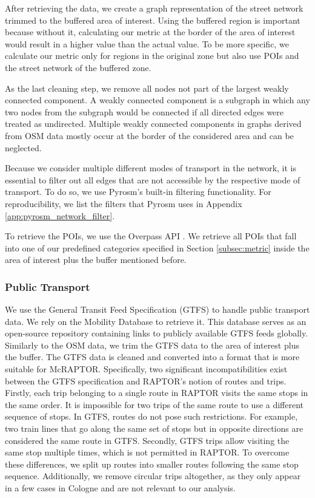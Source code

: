 After retrieving the data, we create a graph representation of the street network trimmed to the buffered area of interest.
Using the buffered region is important because without it, calculating our metric at the border of the area of interest would result in a higher value than the actual value.
To be more specific, we calculate our metric only for regions in the original zone but also use POIs and the street network of the buffered zone.

As the last cleaning step, we remove all nodes not part of the largest weakly connected component.
A weakly connected component is a subgraph in which any two nodes from the subgraph would be connected if all directed edges were treated as undirected.
Multiple weakly connected components in graphs derived from OSM data mostly occur at the border of the considered area and can be neglected.

Because we consider multiple different modes of transport in the network, it is essential to filter out all edges that are not accessible by the respective mode of transport.
To do so, we use Pyrosm's built-in filtering functionality.
For reproducibility, we list the filters that Pyrosm uses in Appendix \ref{app:pyrosm_network_filter}.

To retrieve the POIs, we use the Overpass API .
We retrieve all POIs that fall into one of our predefined categories specified in Section \ref{subsec:metric} inside the area of interest plus the buffer mentioned before.

\subsubsection{Public Transport}
\label{subs:public_transport}

We use the General Transit Feed Specification (GTFS)  to handle public transport data.
We rely on the Mobility Database  to retrieve it.
This database serves as an open-source repository containing links to publicly available GTFS feeds globally.
Similarly to the OSM data, we trim the GTFS data to the area of interest plus the buffer.
The GTFS data is cleaned and converted into a format that is more suitable for McRAPTOR.
Specifically, two significant incompatibilities exist between the GTFS specification and RAPTOR's notion of routes and trips.
Firstly, each trip belonging to a single route in RAPTOR visits the same stops in the same order.
It is impossible for two trips of the same route to use a different sequence of stops.
In GTFS, routes do not pose such restrictions.
For example, two train lines that go along the same set of stops but in opposite directions are considered the same route in GTFS.
Secondly, GTFS trips allow visiting the same stop multiple times, which is not permitted in RAPTOR.
To overcome these differences, we split up routes into smaller routes following the same stop sequence.
Additionally, we remove circular trips altogether, as they only appear in a few cases in Cologne and are not relevant to our analysis.

